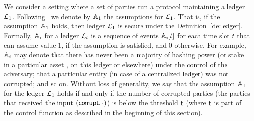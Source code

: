 We consider a setting where a set of parties run a protocol maintaining a ledger $\mathcal{L}_1$. Following~\cite{sidechain} we denote by $\mathbb{A}_1$
the assumptions for $\mathcal{L}_1$.
 That is, if the assumption $\mathbb{A}_1$ holds, then ledger $\mathcal{L}_1$ is secure under the Definition~\ref{de:ledger}.
Formally, $\mathbb{A}_i$ for a ledger $\mathcal{L}_i$ is a sequence of events $\mathbb{A}_i[t]$ for each time slot $t$ that can assume value $1$, 
if the assumption is satisfied, and $0$ otherwise.
For example, $\mathbb{A}_i$ may denote that
there has never been a majority of hashing power (or stake in a particular
asset
, on this ledger or elsewhere) under the control of the adversary; that a
particular entity (in case of a centralized ledger) was not corrupted; and so
on.
Without loss of generality, we say that the assumption $\mathbb{A}_1$ for the ledger $\mathcal{L}_1$ holds if and only if the number of corrupted parties (the parties
that received the input $(\mathsf{corrupt}, \cdot)$) is below the threshold $\mathsf{t}$ (where $\mathsf{t}$ is part of the control function as described in the beginning 
of this section).







